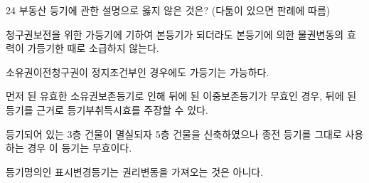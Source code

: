\begin{question}{24}
부동산 등기에 관한 설명으로 옳지 않은 것은? (다툼이 있으면 판례에 따름)
\begin{choices}
  \item 청구권보전을 위한 가등기에 기하여 본등기가 되더라도 본등기에 의한 물권변동의 효력이 가등기한 때로 소급하지 않는다.
  \item 소유권이전청구권이 정지조건부인 경우에도 가등기는 가능하다.
  \item 먼저 된 유효한 소유권보존등기로 인해 뒤에 된 이중보존등기가 무효인 경우, 뒤에 된 등기를 근거로 등기부취득시효를 주장할 수 있다.
  \item 등기되어 있는 3층 건물이 멸실되자 5층 건물을 신축하였으나 종전 등기를 그대로 사용하는 경우 이 등기는 무효이다.
  \item 등기명의인 표시변경등기는 권리변동을 가져오는 것은 아니다.
\end{choices}
\end{question}
